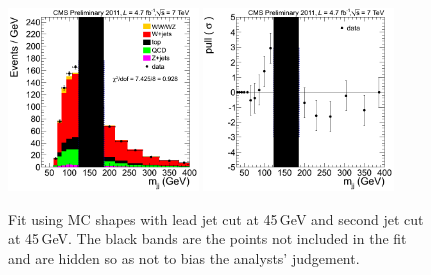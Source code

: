 \begin{figure}
\begin{center}
  \includegraphics[width=0.45\textwidth]{figs/ElectronCuts/hist45_Wjj_Mjj_Electron_2jets_Stacked.png}
  \includegraphics[width=0.45\textwidth]{figs/ElectronCuts/hist45_Wjj_Mjj_Electron_2jets_Pull.png}
\end{center}
\caption{\label{fig:Electron4545}Fit using MC shapes with lead jet cut at 45\,GeV and second jet cut at 45\,GeV.  The black bands are the points not included in the fit and are hidden so as not to bias the analysts' judgement.}
\end {figure}

